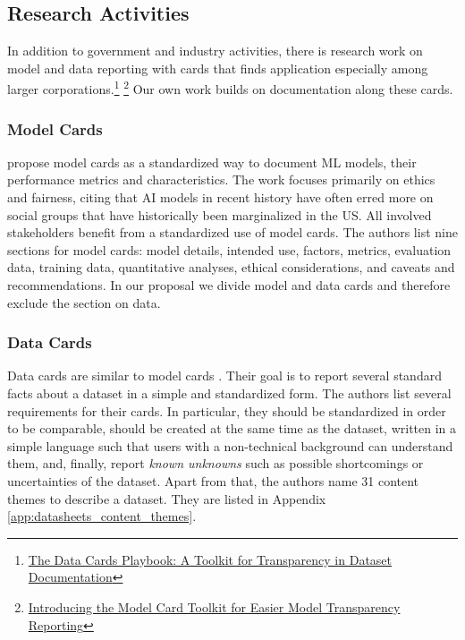 \subsection{Research Activities}
In addition to government and industry activities, there is research work on model and data reporting with cards that finds application especially among larger corporations.\footnote{\href{https://ai.googleblog.com/2022/11/the-data-cards-playbook-toolkit-for.html}{The Data Cards Playbook: A Toolkit for Transparency in Dataset Documentation}} \footnote{\href{https://ai.googleblog.com/2020/07/introducing-model-card-toolkit-for.html}{Introducing the Model Card Toolkit for Easier Model Transparency Reporting}} Our own work builds on documentation along these cards. 

\subsubsection{Model Cards}
\cite{Mitchell2019_ModelCards}  propose model cards as a standardized way to document \ac{ML} models, their performance metrics and characteristics. The work focuses primarily on ethics and fairness, citing that AI models in recent history have often erred more on social groups that have historically been marginalized in the US. All involved stakeholders benefit from a standardized use of model cards. The authors list nine sections for model cards:  model details,  intended use, factors, metrics,  evaluation data,  training data,  quantitative analyses,  ethical considerations, and caveats and recommendations.
In our proposal we divide model and data cards and therefore exclude the section on data. 

\subsubsection{Data Cards}
Data cards are similar to model cards \citep{Pushkarna2022_DataCards}. Their goal is to report several standard facts about a dataset in a simple and standardized form. The authors list several requirements for their cards. In particular, they should be standardized in order to be comparable, should be created at the same time as the dataset, written in a simple language such that users with a non-technical background can understand them, and, finally, report \emph{known unknowns} such as possible shortcomings or uncertainties of the dataset. Apart from that, the authors name 31 content themes to describe a dataset. They are listed in Appendix \ref{app:datasheets_content_themes}. 

